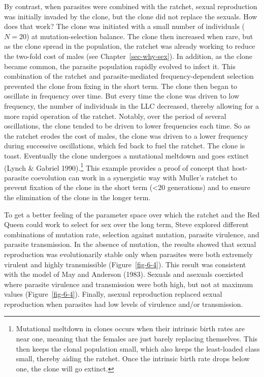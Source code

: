 \documentclass[
  letterpaper,
]{book}
\begin{document}
By contrast, when parasites were combined with the ratchet, sexual
reproduction was initially invaded by the clone, but the clone did not
replace the sexuals. How does that work? The clone was initiated with a
small number of individuals (\(N = 20\)) at mutation-selection balance.
The clone then increased when rare, but as the clone spread in the
population, the ratchet was already working to reduce the two-fold cost
of males (see Chapter~\ref{sec-why-sex}). In addition, as the clone
became common, the parasite population rapidly evolved to infect it.
This combination of the ratchet and parasite-mediated
frequency-dependent selection prevented the clone from fixing in the
short term. The clone then began to oscillate in frequency over time.
But every time the clone was driven to low frequency, the number of
individuals in the LLC decreased, thereby allowing for a more rapid
operation of the ratchet. Notably, over the period of several
oscillations, the clone tended to be driven to lower frequencies each
time. So as the ratchet erodes the cost of males, the clone was driven
to a lower frequency during successive oscillations, which fed back to
fuel the ratchet. The clone is toast. Eventually the clone undergoes a
mutational meltdown and goes extinct (Lynch \& Gabriel 1990).\footnote{Mutational
  meltdown in clones occurs when their intrinsic birth rates are near
  one, meaning that the females are just barely replacing themselves.
  This then keeps the clonal population small, which also keeps the
  least-loaded class small, thereby aiding the ratchet. Once the
  intrinsic birth rate drops below one, the clone will go extinct.} This
example provides a proof of concept that host-parasite coevolution can
work in a synergistic way with Muller's ratchet to prevent fixation of
the clone in the short term (\textless20 generations) and to ensure the
elimination of the clone in the longer term.

To get a better feeling of the parameter space over which the ratchet
and the Red Queen could work to select for sex over the long term, Steve
explored different combinations of mutation rate, selection against
mutation, parasite virulence, and parasite transmission. In the absence
of mutation, the results showed that sexual reproduction was
evolutionarily stable only when parasites were both extremely virulent
and highly transmissible (Figure~\ref{fig-6-4}). This result was
consistent with the model of May and Anderson (1983). Sexuals and
asexuals coexisted where parasite virulence and transmission were both
high, but not at maximum values (Figure~\ref{fig-6-4}). Finally, asexual
reproduction replaced sexual reproduction when parasites had low levels
of virulence and/or transmission.
\end{document}

